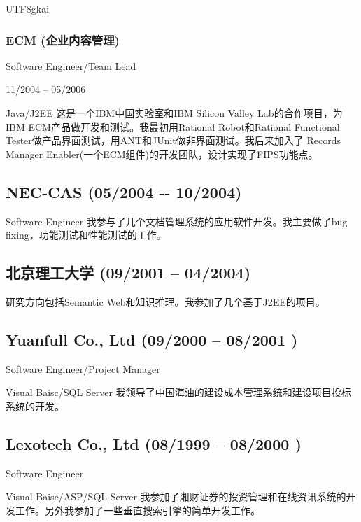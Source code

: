 \documentclass[a4paper]{article}
\newenvironment{DUlineblock}[1]{%
    \list{}{\setlength{\partopsep}{\parskip}
            \addtolength{\partopsep}{\baselineskip}
            \setlength{\topsep}{0pt}
            \setlength{\itemsep}{0.15\baselineskip}
            \setlength{\parsep}{0pt}
            \setlength{\leftmargin}{#1}}
    \raggedright
  }
  {\endlist}
\begin{document}
\begin{CJK}{UTF8}{gkai}
\subsubsection*{ECM (企业内容管理)}
\begin{DUlineblock}{0em}
\item[] Software Engineer/Team Lead
\item[] 11/2004 – 05/2006
\item[] Java/J2EE
\end{DUlineblock}
这是一个IBM中国实验室和IBM Silicon Valley Lab的合作项目，为IBM ECM产品做开发和测试。我最初用Rational
Robot和Rational Functional Tester做产品界面测试，用ANT和JUnit做非界面测试。我后来加入了
Records Manager Enabler(一个ECM组件)的开发团队，设计实现了FIPS功能点。

\subsection*{NEC-CAS (05/2004 -{}- 10/2004)}
\begin{DUlineblock}{0em}
\item[] Software Engineer
\end{DUlineblock}
我参与了几个文档管理系统的应用软件开发。我主要做了bug fixing，功能测试和性能测试的工作。

\subsection*{北京理工大学 (09/2001 – 04/2004)}
研究方向包括Semantic Web和知识推理。我参加了几个基于J2EE的项目。


\subsection*{Yuanfull Co., Ltd (09/2000 – 08/2001 )}
\begin{DUlineblock}{0em}
\item[] Software Engineer/Project Manager
\item[] Visual Baisc/SQL Server
\end{DUlineblock}
我领导了中国海油的建设成本管理系统和建设项目投标系统的开发。

\subsection*{Lexotech Co., Ltd (08/1999 – 08/2000 )}
\begin{DUlineblock}{0em}
\item[] Software Engineer
\item[] Visual Baisc/ASP/SQL Server
\end{DUlineblock}
我参加了湘财证券的投资管理和在线资讯系统的开发工作。另外我参加了一些垂直搜索引擎的简单开发工作。



\end{CJK}
\end{document}

